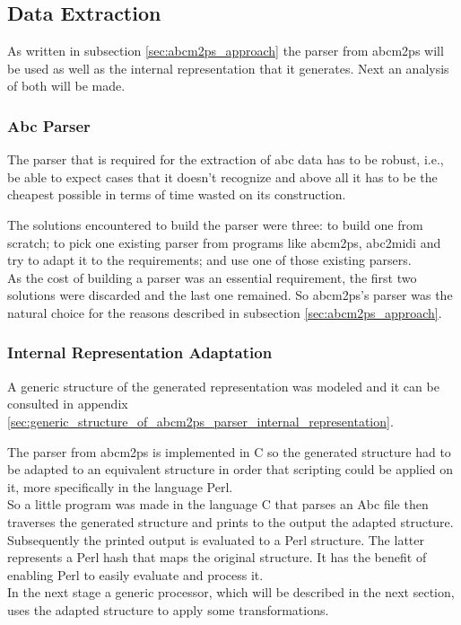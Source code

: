 \documentclass[main.tex]{subfiles}
\begin{document}
\subsection{Data Extraction} 

As written in subsection \ref{sec:abcm2ps_approach} the parser from abcm2ps will be used as well as
the internal representation that it generates. Next an analysis of both will be made.

\subsubsection{Abc Parser} 

The parser that is required for the extraction of abc data has to be robust, i.e., be able to expect
cases that it doesn't recognize and above all it has to be the cheapest possible in terms of time
wasted on its construction.

The solutions encountered to build the parser were three: to build one from scratch; to pick one
existing parser from programs like abcm2ps, abc2midi and try to adapt it to the requirements; and
use one of those existing parsers.\\
As the cost of building a parser was an essential requirement, the first two solutions were
discarded and the last one remained. So abcm2ps's parser was the natural choice for the reasons
described in subsection \ref{sec:abcm2ps_approach}.

\subsubsection{Internal Representation Adaptation}

A generic structure of the generated representation was modeled and it can be consulted in appendix
\ref{sec:generic_structure_of_abcm2ps_parser_internal_representation}.

The parser from abcm2ps is implemented in C so the generated structure had to be adapted to an
equivalent structure in order that scripting could be applied on it, more specifically in the 
language Perl.\\
So a little program was made in the language C that parses an Abc file then traverses the generated
structure and prints to the output the adapted structure. Subsequently the printed output is
evaluated to a Perl structure. The latter represents a Perl hash that maps the original structure.
It has the benefit of enabling Perl to easily evaluate and process it.\\
In the next stage a generic processor, which will be described in the next section, uses the adapted
structure to apply some transformations.\\
\end{document}
